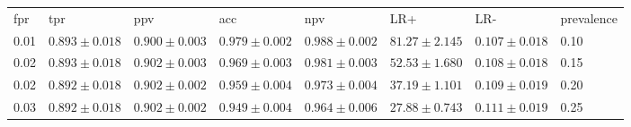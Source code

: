 \begin{tabular}{L{.69in}|L{.75in}|L{.75in}|L{.75in}|L{.75in}|L{.75in}|L{.75in}|L{.75in}}\hline
fpr&tpr&ppv&acc&npv&LR+&LR-&prevalence\\
0.01& $0.893  \pm  0.018$ & $0.900  \pm  0.003$ & $0.979  \pm  0.002$ & $0.988  \pm  0.002$ & $81.27  \pm  2.145$ & $0.107  \pm  0.018$ &0.10\\
0.02& $0.893  \pm  0.018$ & $0.902  \pm  0.003$ & $0.969  \pm  0.003$ & $0.981  \pm  0.003$ & $52.53  \pm  1.680$ & $0.108  \pm  0.018$ &0.15\\
0.02& $0.892  \pm  0.018$ & $0.902  \pm  0.002$ & $0.959  \pm  0.004$ & $0.973  \pm  0.004$ & $37.19  \pm  1.101$ & $0.109  \pm  0.019$ &0.20\\
0.03& $0.892  \pm  0.018$ & $0.902  \pm  0.002$ & $0.949  \pm  0.004$ & $0.964  \pm  0.006$ & $27.88  \pm  0.743$ & $0.111  \pm  0.019$ &0.25\\
\hline\end{tabular}
